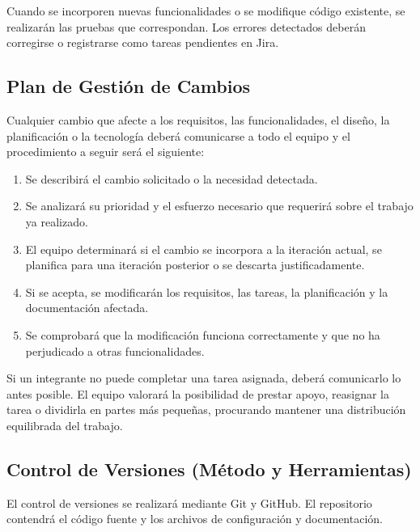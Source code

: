 Cuando se incorporen nuevas funcionalidades o se modifique código existente, se realizarán las pruebas que correspondan. Los errores detectados deberán corregirse o registrarse como tareas pendientes en Jira.

\subsection{Plan de Gestión de Cambios}

Cualquier cambio que afecte a los requisitos, las funcionalidades, el diseño, la planificación o la tecnología deberá comunicarse a todo el equipo y el procedimiento a seguir será el siguiente:

\begin{enumerate}
    \item Se describirá el cambio solicitado o la necesidad detectada.
    \item Se analizará su prioridad y el esfuerzo necesario que requerirá sobre el trabajo ya realizado.
    \item El equipo determinará si el cambio se incorpora a la iteración actual, se planifica para una iteración posterior o se descarta justificadamente.
    \item Si se acepta, se modificarán los requisitos, las tareas, la planificación y la documentación afectada.
    \item Se comprobará que la modificación funciona correctamente y que no ha perjudicado a otras funcionalidades.
\end{enumerate}

Si un integrante no puede completar una tarea asignada, deberá comunicarlo lo antes posible. El equipo valorará la posibilidad de prestar apoyo, reasignar la tarea o dividirla en partes más pequeñas, procurando mantener una distribución equilibrada del trabajo.

\subsection{Control de Versiones (Método y Herramientas)}

El control de versiones se realizará mediante Git y GitHub. El repositorio contendrá el código fuente y los archivos de configuración y documentación.

